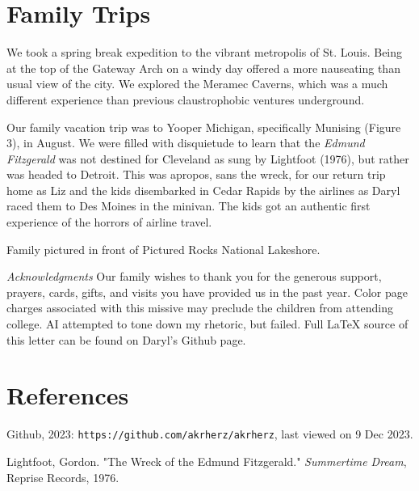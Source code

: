 \documentclass[letterpaper,11pt]{article}
\makeatletter
\def\refer{\par\noindent\hangindent\parindent\hangafter1}
\newenvironment{figurehere}
  {\def\@captype{figure}}
  {}
\makeatother
\begin{document}
\begin{multicols}{2}
\section{Family Trips}

We took a spring break expedition to the vibrant metropolis of St. Louis.
Being at the top of the Gateway Arch on a windy day offered a more nauseating
than usual view of the city.  We explored the
Meramec Caverns, which was a much different experience than previous
claustrophobic ventures underground.

Our family vacation trip was to Yooper Michigan, specifically Munising (Figure 3), in
August.  We were filled with disquietude to learn that the \textit{Edmund Fitzgerald} was not
destined for Cleveland as sung by Lightfoot (1976), but rather was headed to
Detroit.  This was apropos, sans the wreck, for our return trip home as Liz and the kids
disembarked in Cedar Rapids by the airlines as Daryl raced them to Des
Moines in the minivan.  The kids got an authentic first experience of the
horrors of airline travel.

\bigskip

\begin{figurehere}
    \centering   
    \caption{Family pictured in front of Pictured Rocks National Lakeshore.}
\end{figurehere}

\bigskip

\emph{Acknowledgments} Our family wishes to thank you for the generous 
support, prayers, cards, gifts, and visits you have provided us in the past
year. Color page charges associated with this missive may preclude the children
from attending college. AI attempted to tone down my rhetoric, but failed. Full
\LaTeX\xspace source of this letter can be found on Daryl's Github page. 

\section{References}

\refer Github, 2023: \texttt{https://github.com/akrherz/akrherz}, last viewed on 9 Dec 2023.
\refer Lightfoot, Gordon. "The Wreck of the Edmund Fitzgerald." \emph{Summertime Dream}, Reprise Records, 1976.

\end{multicols}
\end{document}
